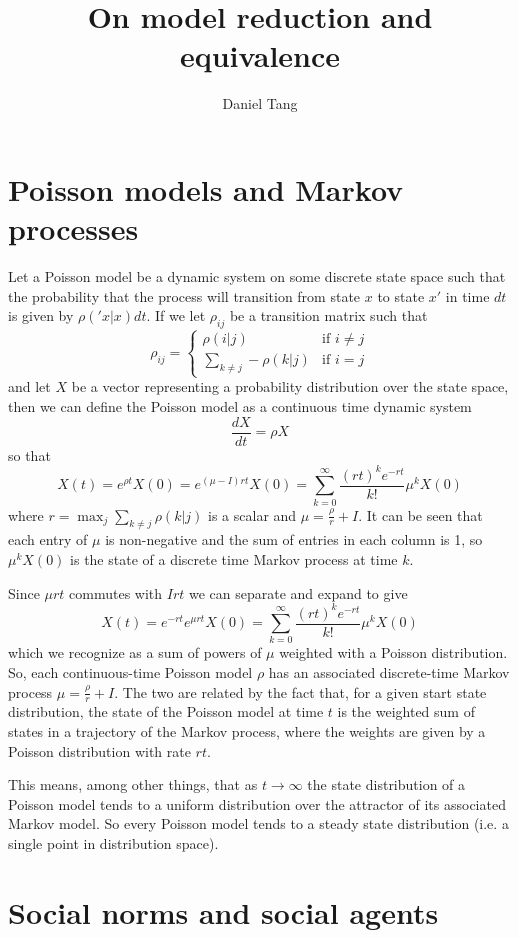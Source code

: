 \documentclass[a4paper]{article}
\title{On model reduction and equivalence}
\author{Daniel Tang}
\begin{document}
\maketitle
\section{Poisson models and Markov processes}

Let a Poisson model be a dynamic system on some discrete state space such that the probability that the process will transition from state $x$ to state $x'$ in time $dt$ is given by $\rho('x|x)dt$. If we let $\rho_{ij}$ be a transition matrix such that
\[
\rho_{ij} = 
\begin{cases}
\rho(i|j) & \text{if } i \ne j\\
\sum_{k \ne j} -\rho(k|j) & \text{if } i = j
\end{cases}
\]
and let $X$ be a vector representing a probability distribution over the state space, then we can define the Poisson model as a continuous time dynamic system
\[
\frac{dX}{dt} = \rho X
\]
so that
\[
X(t) = e^{\rho t}X(0) = e^{(\mu - I)rt}X(0) = \sum_{k=0}^\infty \frac{ (rt)^k e^{-rt}}{k!}\mu^kX(0)
\]
where $r = \max_j \sum_{k \ne j} \rho(k|j)$ is a scalar and $\mu = \frac{\rho}{r} + I$. It can be seen that each entry of $\mu$ is non-negative and the sum of entries in each column is 1, so $\mu^k X(0)$ is the state of a discrete time Markov process at time $k$.

Since $\mu rt$ commutes with $Irt$ we can separate and expand to give
\[
X(t) = e^{-rt}e^{\mu rt}X(0) = \sum_{k=0}^\infty \frac{ (rt)^k e^{-rt}}{k!}\mu^kX(0)
\]
which we recognize as a sum of powers of $\mu$ weighted with a Poisson distribution. So, each continuous-time Poisson model $\rho$ has an associated discrete-time Markov process $\mu = \frac{\rho}{r} + I$. The two are related by the fact that, for a given start state distribution, the state of the Poisson model at time $t$ is the weighted sum of states in a trajectory of the Markov process, where the weights are given by a Poisson distribution with rate $rt$.

This means, among other things, that as $t \to \infty$ the state distribution of a Poisson model tends to a uniform distribution over the attractor of its associated Markov model. So every Poisson model tends to a steady state distribution (i.e. a single point in distribution space).

\section{Social norms and social agents}
\end{document}
